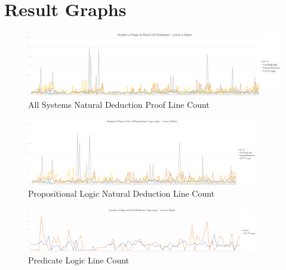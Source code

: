\documentclass[ms]{uncgdissertationexp2}
\theoremstyle{plain}
\theoremstyle{definition}
\theoremstyle{remark}
\begin{document}
\chapter{Result Graphs}

\begin{figure}
	\centering
	\includegraphics[width=1\textwidth]{all-proofs-graph.png}
	\caption{All Systems Natural Deduction Proof Line Count}
	\label{fig:allproofsgraph}
\end{figure} 

\begin{figure}[ht]
	\centering
	\includegraphics[width=0.9\textwidth]{prop-graph.png}
	\caption{Propositional Logic Natural Deduction Line Count}
	\label{fig:propgraph}
\end{figure} 

\begin{figure}[ht]
	\centering
	\includegraphics[width=0.9\textwidth]{pred-graph.png}
	\caption{Predicate Logic Line Count}
	\label{fig:predgraph}
\end{figure} 

\backmatter
\end{document}
